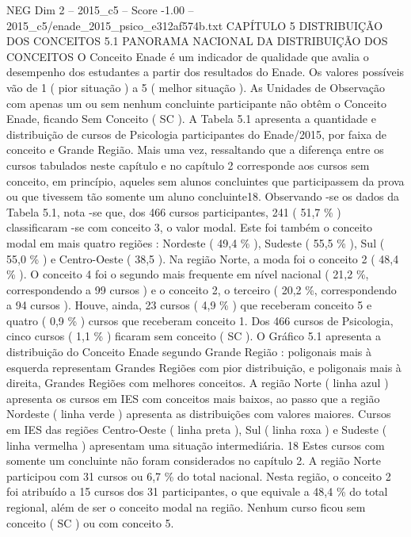 \begin{textsample}{NEG Dim 2 – 2015\_c5 – Score -1.00 – 2015\_c5/enade\_2015\_psico\_e312af574b.txt}  \label{ex:f2_neg_160}
CAPÍTULO 5 DISTRIBUIÇÃO DOS CONCEITOS 5.1 PANORAMA NACIONAL DA DISTRIBUIÇÃO DOS CONCEITOS O Conceito Enade é um indicador de qualidade que avalia o desempenho dos estudantes a partir dos resultados do Enade.
Os valores possíveis vão de 1 ( pior situação ) a 5 ( melhor situação ).
As Unidades de Observação com apenas um ou sem nenhum concluinte participante não obtêm o Conceito Enade, ficando Sem Conceito ( SC ).
A Tabela 5.1 apresenta a quantidade e distribuição de cursos de Psicologia participantes do Enade/2015, por faixa de conceito e Grande Região.
Mais uma vez, ressaltando que a diferença entre os cursos tabulados neste capítulo e no capítulo 2 corresponde aos cursos sem conceito, em princípio, aqueles sem alunos concluintes que participassem da prova ou que tivessem tão somente um aluno concluinte18.
Observando -se os dados da Tabela 5.1, nota -se que, dos 466 cursos participantes, 241 ( 51,7 \% ) classificaram -se com conceito 3, o valor modal.
Este foi também o conceito modal em mais quatro regiões : Nordeste ( 49,4 \% ), Sudeste ( 55,5 \% ), Sul ( 55,0 \% ) e Centro-Oeste ( 38,5 ).
Na região Norte, a moda foi o conceito 2 ( 48,4 \% ).
O conceito 4 foi o segundo mais frequente em nível nacional ( 21,2 \%, correspondendo a 99 cursos ) e o conceito 2, o terceiro ( 20,2 \%, correspondendo a 94 cursos ).
Houve, ainda, 23 cursos ( 4,9 \% ) que receberam conceito 5 e quatro ( 0,9 \% ) cursos que receberam conceito 1.
Dos 466 cursos de Psicologia, cinco cursos ( 1,1 \% ) ficaram sem conceito ( SC ).
O Gráfico 5.1 apresenta a distribuição do Conceito Enade segundo Grande Região : poligonais mais à esquerda representam Grandes Regiões com pior distribuição, e poligonais mais à direita, Grandes Regiões com melhores conceitos.
A região Norte ( linha azul ) apresenta os cursos em IES com conceitos mais baixos, ao passo que a região Nordeste ( linha verde ) apresenta as distribuições com valores maiores.
Cursos em IES das regiões Centro-Oeste ( linha preta ), Sul ( linha roxa ) e Sudeste ( linha vermelha ) apresentam uma situação intermediária. 18 Estes cursos com somente um concluinte não foram considerados no capítulo 2.
A região Norte participou com 31 cursos ou 6,7 \% do total nacional.
Nesta região, o conceito 2 foi atribuído a 15 cursos dos 31 participantes, o que equivale a 48,4 \% do total regional, além de ser o conceito modal na região.
Nenhum curso ficou sem conceito ( SC ) ou com conceito 5.

\end{textsample}
